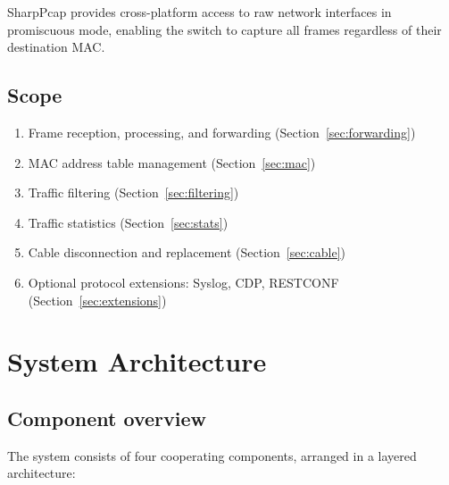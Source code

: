 \documentclass[12pt,a4paper]{article}
\begin{document}
SharpPcap provides cross-platform access to raw network interfaces in
promiscuous mode, enabling the switch to capture all frames regardless of their
destination MAC.

\subsection{Scope}

\begin{enumerate}[noitemsep]
  \item Frame reception, processing, and forwarding (Section~\ref{sec:forwarding})
  \item MAC address table management (Section~\ref{sec:mac})
  \item Traffic filtering (Section~\ref{sec:filtering})
  \item Traffic statistics (Section~\ref{sec:stats})
  \item Cable disconnection and replacement (Section~\ref{sec:cable})
  \item Optional protocol extensions: Syslog, CDP, RESTCONF
        (Section~\ref{sec:extensions})
\end{enumerate}

\section{System Architecture}

\subsection{Component overview}

The system consists of four cooperating components, arranged in a layered
architecture:
\end{document}
